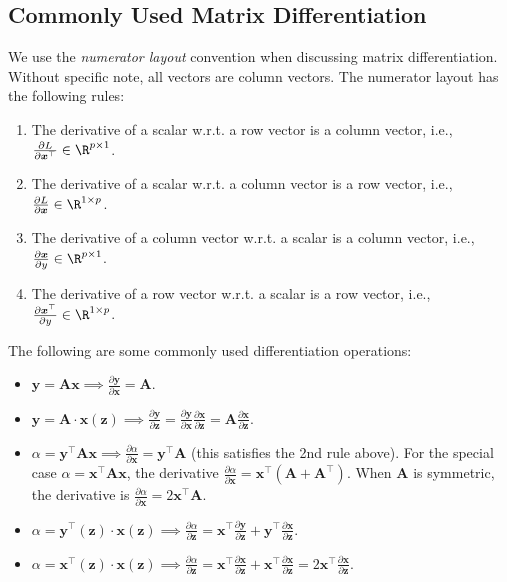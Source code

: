 \subsection{Commonly Used Matrix Differentiation}
    We use the \emph{numerator layout} convention when discussing matrix differentiation.
    Without specific note, all vectors are column vectors.
    The numerator layout has the following rules:
        \begin{enumerate}
            \item The derivative of a scalar w.r.t. a row vector is a column vector, i.e., $\frac{\partial L}{\partial \bm{x}^\top} \in \R^{\nfeat \times 1}$.
            \item The derivative of a scalar w.r.t. a column vector is a row vector, i.e., $\frac{\partial L}{\partial \bm{x} } \in \R^{1 \times \nfeat}$.
            \item The derivative of a column vector w.r.t. a scalar is a column vector, i.e., $\frac{\partial \bm{x}}{\partial y } \in \R^{ \nfeat \times 1}$.
            \item The derivative of a row vector w.r.t. a scalar is a row vector, i.e., $\frac{\partial \bm{x}^\top }{\partial y } \in \R^{ 1 \times \nfeat}$.
        \end{enumerate}
    The following are some commonly used differentiation operations:
        \begin{itemize}
            \item $\bm{y} = \bm{A} \bm{x} \implies \frac{\partial \bm{y}}{\partial \bm{x}} = \bm{A}$.
            \item $\bm{y} = \bm{A} \cdot  \bm{x}(\bm{z}) \implies \frac{\partial \bm{y}}{\partial \bm{z}} = \frac{\partial \bm{y}}{\partial \bm{x}} \frac{\partial \bm{x}}{\partial \bm{z}} = \bm{A} \frac{\partial \bm{x}}{\partial \bm{z}}$.
            \item $\alpha = \bm{y}^\top \bm{A} \bm{x} \implies \frac{\partial \alpha}{\partial \bm{x}} = \bm{y}^\top \bm{A}$ (this satisfies the 2nd rule above). For the special case $\alpha = \bm{x}^\top \bm{A} \bm{x}$, the derivative $\frac{\partial \alpha}{\partial \bm{x}} = \bm{x}^\top (\bm{A} + \bm{A}^\top)$. When $\bm{A}$ is symmetric, the derivative is $\frac{\partial \alpha}{\partial \bm{x}} = 2\bm{x}^\top \bm{A}$.
            \item $\alpha = \bm{y}^\top(\bm{z}) \cdot \bm{x}(\bm{z}) \implies \frac{\partial \alpha}{\partial \bm{z}} = \bm{x}^\top \frac{\partial \bm{y}}{\partial \bm{z}} + \bm{y}^\top \frac{\partial \bm{x}}{\partial \bm{z}}$.
            \item $\alpha = \bm{x}^\top(\bm{z}) \cdot \bm{x}(\bm{z}) \implies \frac{\partial \alpha}{\partial \bm{z}} = \bm{x}^\top \frac{\partial \bm{x}}{\partial \bm{z}} + \bm{x}^\top \frac{\partial \bm{x}}{\partial \bm{z}} = 2\bm{x}^\top \frac{\partial \bm{x}}{\partial \bm{z}}$.
        \end{itemize}
        
